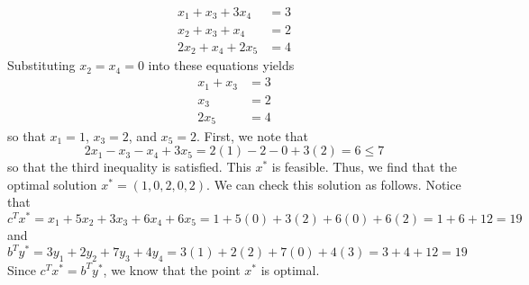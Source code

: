 \documentclass[12pt]{article}
\begin{document}
\begin{align*}
x_1 + x_3 + 3x_4 &= 3\\
x_2+x_3+x_4 &= 2\\
2x_2 + x_4 + 2x_5 &= 4
\end{align*} Substituting $x_2 = x_4 = 0$ into these equations yields
\begin{align*}
x_1 + x_3&= 3\\
x_3 &= 2\\
2x_5 &= 4
\end{align*}
so that $x_1  = 1$, $x_3 = 2$, and $x_5 = 2$. First, we note that
\[
2x_1-x_3-x_4+3x_5 = 2(1) - 2 - 0 + 3(2) = 6 \leq 7
\] so that the third inequality is satisfied. This $x^*$ is feasible. Thus, we find that the optimal solution $x^* = (1,0,2,0,2)$.
We can check this solution as follows. Notice that
\[
c^Tx^* = x_1 + 5x_2 + 3x_3 + 6x_4 + 6x_5 = 1 + 5(0) + 3(2) + 6(0) + 6(2) = 1 + 6 + 12 = 19
\] and
\[
b^Ty^* = 3y_1 + 2y_2 + 7y_3 + 4y_4 = 3(1) + 2(2) + 7(0) + 4(3) = 3 + 4 + 12 = 19
\] Since $c^Tx^* = b^Ty^*$, we know that the point $x^*$ is optimal.
\end{document}
